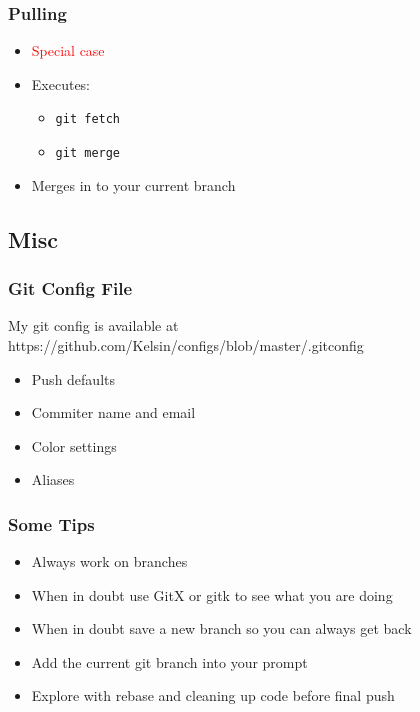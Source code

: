 \begin{frame}
  \frametitle{Pulling}
  \begin{itemize}
  \item \textcolor{red}{Special case}
  \item Executes:
    \begin{itemize}
    \item \texttt{git fetch}
    \item \texttt{git merge}
    \end{itemize}
  \item Merges in to your current branch
  \end{itemize}
\end{frame}

\subsection{Misc}

\begin{frame}
  \frametitle{Git Config File}
  My git config is available at https://github.com/Kelsin/configs/blob/master/.gitconfig
  \begin{itemize}
    \item Push defaults
    \item Commiter name and email
    \item Color settings
    \item Aliases
  \end{itemize}
\end{frame}

\begin{frame}
  \frametitle{Some Tips}
  \begin{itemize}
    \item Always work on branches
      \pause
    \item When in doubt use GitX or gitk to see what you are doing
      \pause
    \item When in doubt save a new branch so you can always get back
      \pause
    \item Add the current git branch into your prompt
      \pause
    \item Explore with rebase and cleaning up code before final push
  \end{itemize}
\end{frame}


